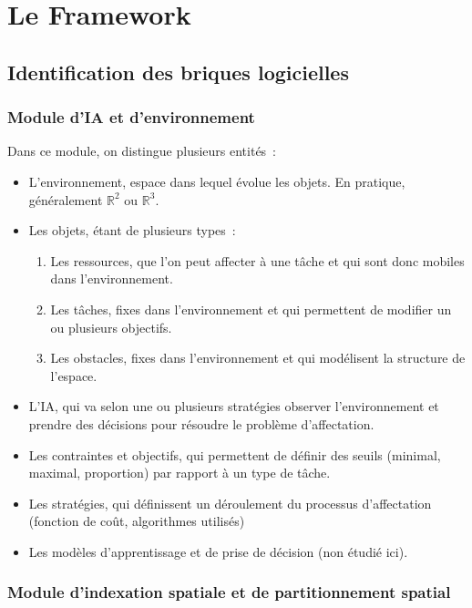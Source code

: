 \section{Le Framework}

\subsection{Identification des briques logicielles}

%
\subsubsection{Module d'IA et d'environnement}

Dans ce module, on distingue plusieurs entités~:
\renewcommand{\labelitemi}{$\bullet$}
\begin{itemize}
\setlength{\itemsep}{5pt}
\item L'environnement, espace dans lequel évolue les objets. En pratique, généralement $\mathbb{R}^2$ ou $\mathbb{R}^3$.
\item Les objets, étant de plusieurs types~:
	\begin{enumerate}
	\item Les ressources, que l'on peut affecter à une tâche et qui sont donc mobiles dans l'environnement.
	\item Les tâches, fixes dans l'environnement et qui permettent de modifier un ou plusieurs objectifs.
	\item Les obstacles, fixes dans l'environnement et qui modélisent la structure de l'espace.
	\end{enumerate}
\item L'IA, qui va selon une ou plusieurs stratégies observer l'environnement et prendre des décisions pour résoudre le problème d'affectation.
\item Les contraintes et objectifs, qui permettent de définir des seuils (minimal, maximal, proportion) par rapport à un type de tâche.
\item Les stratégies, qui définissent un déroulement du processus d'affectation (fonction de coût, algorithmes utilisés)
\item Les modèles d'apprentissage et de prise de décision (non étudié ici).
\end{itemize} %

%
\subsubsection{Module d'indexation spatiale et de partitionnement spatial}

